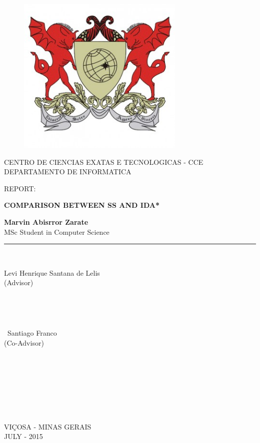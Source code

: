 \documentclass[a4paper,12pt]{article}
\begin{document}
\begin{titlepage}

\begin{center}
\vspace*{-1in}
\begin{figure}[htb]
\begin{center}
\includegraphics[width=8cm]{./image/ufv1}
\end{center}
\end{figure}

CENTRO DE CIENCIAS EXATAS E TECNOLOGICAS - CCE\\
\vspace*{0.15in}
DEPARTAMENTO DE INFORMATICA \\
\vspace*{0.6in}
\begin{large}
REPORT:\\
\end{large}
\vspace*{0.2in}
\begin{Large}
\textbf{COMPARISON BETWEEN SS AND IDA*} \\
\end{Large}
\vspace*{0.3in}
\begin{large}
\textbf{Marvin Abisrror Zarate} \\
MSc Student in Computer Science \\
\end{large}
\vspace*{0.3in}
\rule{80mm}{0.1mm}\\
\vspace*{0.1in}
\begin{large}
Levi Henrique Santana de Lelis \\
(Advisor)
\

\

\

\
Santiago Franco \\
(Co-Advisor)
\

\

\

\

\
\end{large}
VIÇOSA - MINAS GERAIS\\
JULY - 2015
\end{center}
\end{titlepage}
\end{document}
